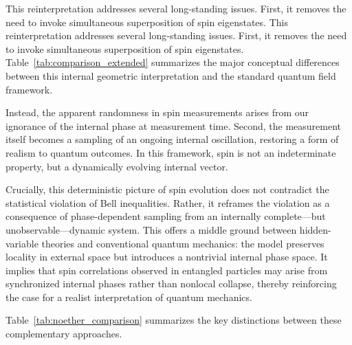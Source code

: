 \documentclass[%
 reprint,
 amsmath,amssymb,
 aps,
]{revtex4-1}
\numberwithin{equation}{section}%
\begin{document}
This reinterpretation addresses several long-standing issues. First, it removes the need to invoke simultaneous superposition of spin eigenstates. This reinterpretation addresses several long-standing issues. First, it removes the need to invoke simultaneous superposition of spin eigenstates. Table~\ref{tab:comparison_extended} summarizes the major conceptual differences between this internal geometric interpretation and the standard quantum field framework.

Instead, the apparent randomness in spin measurements arises from our ignorance of the internal phase at measurement time. Second, the measurement itself becomes a sampling of an ongoing internal oscillation, restoring a form of realism to quantum outcomes. In this framework, spin is not an indeterminate property, but a dynamically evolving internal vector.

Crucially, this deterministic picture of spin evolution does not contradict the statistical violation of Bell inequalities. Rather, it reframes the violation as a consequence of phase-dependent sampling from an internally complete—but unobservable—dynamic system. This offers a middle ground between hidden-variable theories and conventional quantum mechanics: the model preserves locality in external space but introduces a nontrivial internal phase space. It implies that spin correlations observed in entangled particles may arise from synchronized internal phases rather than nonlocal collapse, thereby reinforcing the case for a realist interpretation of quantum mechanics.

Table~\ref{tab:noether_comparison} summarizes the key distinctions between these complementary approaches.
\end{document}
